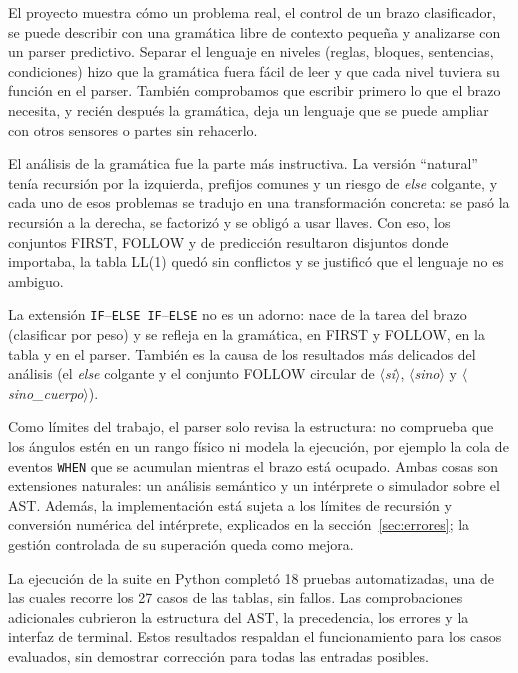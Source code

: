 \documentclass[10pt,a4paper]{article}
\newcommand{\nt}[1]{\ensuremath{\langle}\textit{#1}\ensuremath{\rangle}}   %
\newcommand{\tm}[1]{\texttt{#1}}                                          %
\begin{document}
El proyecto muestra cómo un problema real, el control de un brazo clasificador, se puede describir con una gramática
libre de contexto pequeña y analizarse con un parser predictivo. Separar el lenguaje en niveles (reglas, bloques,
sentencias, condiciones) hizo que la gramática fuera fácil de leer y que cada nivel tuviera su función en el parser.
También comprobamos que escribir primero lo que el brazo necesita, y recién después la gramática, deja un lenguaje que
se puede ampliar con otros sensores o partes sin rehacerlo.

El análisis de la gramática fue la parte más instructiva. La versión ``natural'' tenía recursión por la izquierda,
prefijos comunes y un riesgo de \emph{else} colgante, y cada uno de esos problemas se tradujo en una transformación
concreta: se pasó la recursión a la derecha, se factorizó y se obligó a usar llaves. Con eso, los conjuntos FIRST, FOLLOW
y de predicción resultaron disjuntos donde importaba, la tabla LL(1) quedó sin conflictos y se justificó que el lenguaje
no es ambiguo.

La extensión \tm{IF}--\tm{ELSE IF}--\tm{ELSE} no es un adorno: nace de la tarea del brazo (clasificar por peso) y se refleja
en la gramática, en FIRST y FOLLOW, en la tabla y en el parser. También es la causa de los resultados más delicados del
análisis (el \emph{else} colgante y el conjunto FOLLOW circular de \nt{si}, \nt{sino} y \nt{sino\_cuerpo}).

Como límites del trabajo, el parser solo revisa la estructura: no comprueba que los ángulos estén en un rango físico ni
modela la ejecución, por ejemplo la cola de eventos \tm{WHEN} que se acumulan mientras el brazo está ocupado. Ambas cosas
son extensiones naturales: un análisis semántico y un intérprete o simulador sobre el AST. Además,
la implementación está sujeta a los límites de recursión y conversión numérica del intérprete,
explicados en la sección~\ref{sec:errores}; la gestión controlada de su superación queda como mejora.

La ejecución de la suite en Python completó 18 pruebas automatizadas, una de las cuales recorre los 27 casos de las tablas, sin fallos. Las comprobaciones adicionales cubrieron la estructura del AST, la precedencia, los errores y la interfaz de terminal. Estos resultados respaldan el funcionamiento para los casos evaluados, sin demostrar corrección para todas las entradas posibles.

\end{document}
